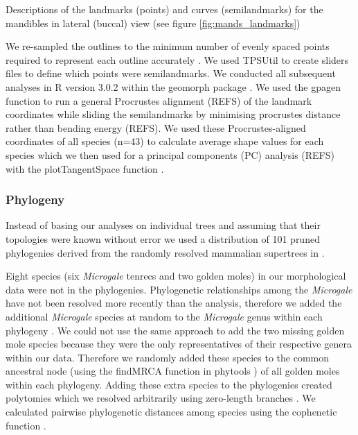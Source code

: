 \documentclass[12pt,a4paper]{article}
\begin{document}

\begin{table}[H]			
\centering
\caption{Descriptions of the landmarks (points) and curves (semilandmarks) for the mandibles in lateral (buccal) view (see figure \ref{fig:mands_landmarks})}

\label{tab:mands_landmarks} %
\end{table}



We re-sampled the outlines to the minimum number of evenly spaced points required to represent each outline accurately \citep[][details in supplementary material]{MacLeod2013}. We used TPSUtil \citep{Rohlf2012} to create sliders files \citep{Zelditch2012} to define which points were semilandmarks. We conducted all subsequent analyses in R version 3.0.2 \citep[R Development Core][]{Team2013} within the geomorph package \citep{Adams2013}. We used the gpagen function to run a general Procrustes alignment (REFS) of the landmark coordinates while sliding the semilandmarks by minimising procrustes distance rather than bending energy (REFS). We used these Procrustes-aligned coordinates of all species (n=43) to calculate average shape values for each species which we then used for a principal components (PC) analysis (REFS) with the plotTangentSpace function \citep{Adams2013}. 

\subsubsection{Phylogeny} 
Instead of basing our analyses on individual trees and assuming that their topologies were known without error \citep[e.g.][]{Ruta2013, Foth2012, Brusatte2008, Harmon2003} we used a distribution of 101 pruned phylogenies derived from the randomly resolved mammalian supertrees in \citep{Kuhn2011}. 

Eight species (six \textit{Microgale} tenrecs and two golden moles) in our morphological data were not in the phylogenies. Phylogenetic relationships among the \textit{Microgale} have not been resolved more recently than the \citep{Kuhn2011} analysis, therefore we added the additional \textit{Microgale} species at random to the \textit{Microgale} genus within each phylogeny \citep{Revell2012}. We could not use the same approach to add the two missing golden mole species because they were the only representatives of their respective genera within our data. Therefore we randomly added these species to the common ancestral node (using the findMRCA function in phytools \citep{Revell2012}) of all golden moles within each phylogeny. Adding these extra species to the phylogenies created polytomies which we resolved arbitrarily using zero-length branches \citep{Paradis2004}. We calculated pairwise phylogenetic distances among species using the cophenetic function \citep[R Development Core][]{Team2013}. 
	
\end{document}
